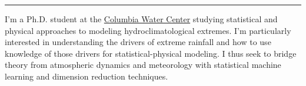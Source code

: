 
\vskip 1cm
\hrule
\vskip 1cm

I'm a Ph.D. student at the \href{http://water.columbia.edu}{Columbia Water Center} studying statistical and physical approaches to modeling hydroclimatological extremes.
I'm particularly interested in understanding the drivers of extreme rainfall and how to use knowledge of those drivers for statistical-physical modeling.
I thus seek to bridge theory from atmospheric dynamics and meteorology with statistical machine learning and dimension reduction techniques.

